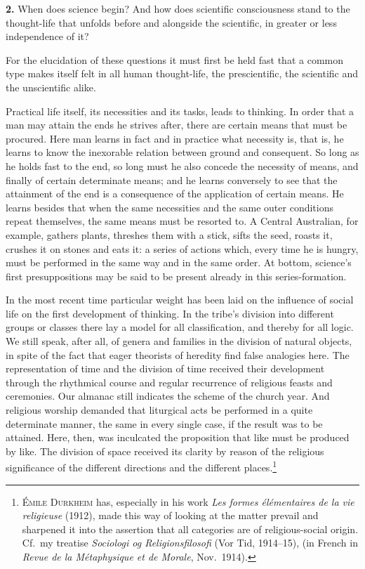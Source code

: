 \documentclass[12pt]{book}
\newcommand{\hnum}[1]{\textbf{#1.}\enspace}
\newcommand{\opage}[1]{\marginnote{\footnotesize\textit{[#1]}}}
\begin{document}
\hnum{2} When does science begin? And how does scientific consciousness stand to
the thought-life that unfolds before and alongside the scientific, in greater or
less independence of it?

For the elucidation of these questions it must first be held fast that a common
type makes itself felt in all human thought-life, the prescientific, the
scientific and the unscientific alike.

Practical life itself, its necessities and its tasks, leads to thinking. In
order that a man may attain the ends he strives after, there are certain means
that must be procured. Here man learns in fact and in practice what necessity
is, that is, he learns to know the inexorable relation between ground and
consequent. So long as he holds fast to the end, so long must he also concede
the necessity of means, and finally of certain determinate means; and he learns
conversely to see that the attainment of the end is a consequence of the
application of certain means. He learns besides that when the same necessities
and the same outer conditions repeat themselves, the same means must be resorted
to. A Central Australian, for example, gathers plants, threshes them with a
stick, sifts the seed, roasts it, crushes it on stones and eats it: a series of
actions which, every time he is hungry, must be performed \opage{5}in the same way and in
the same order. At bottom, science's first presuppositions may be said to be
present already in this series-formation.

In the most recent time particular weight has been laid on the influence of
social life on the first development of thinking. In the tribe's division into
different groups or classes there lay a model for all classification, and
thereby for all logic. We still speak, after all, of genera and families in the
division of natural objects, in spite of the fact that eager theorists of
heredity find false analogies here. The representation of time and the division
of time received their development through the rhythmical course and regular
recurrence of religious feasts and ceremonies. Our almanac still indicates the
scheme of the church year. And religious worship demanded that liturgical acts
be performed in a quite determinate manner, the same in every single case, if
the result was to be attained. Here, then, was inculcated the proposition that
like must be produced by like. The division of space received its clarity by
reason of the religious significance of the different directions and the
different places.\footnote{\textsc{Émile Durkheim} has, especially in his work
\textit{Les formes élémentaires de la vie religieuse} (1912), made this way of
looking at the matter prevail and sharpened it into the assertion that all
categories are of religious-social origin. Cf.\ my treatise \textit{Sociologi og
Religionsfilosofi} (Vor Tid, 1914--15), (in French in \textit{Revue de la
Métaphysique et de Morale}, Nov.\ 1914).}
\end{document}
